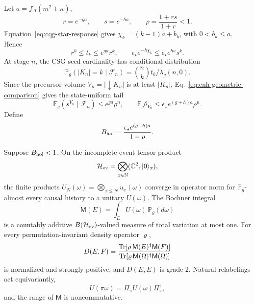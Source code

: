 Let \(a=f_\Delta(m^2+\kappa)\),
\[
 r=e^{-ga},\qquad s=e^{-ha},\qquad
 \rho=\frac{1+rs}{1+r}<1.
\]
Equation~\eqref{eq:cqg-star-response} gives
\(\chi_k=(k-1)a+b_k\), with \(0<b_k\le a\).  Hence
\begin{equation}
 r^k\le t_k\le e^{ga}r^k,\qquad
 \epsilon_\star e^{-h\chi_k}
 \le \epsilon_\star e^{ha}s^k.
 \label{eq:cnh-geometric-comparison}
\end{equation}
At stage \(n\), the CSG seed cardinality has conditional distribution
\[
 \mathbb P_g(|K_n|=k\mid\mathcal F_n)
 =\binom nk t_k/\lambda_g(n,0).
\]
Since the precursor volume \(V_n=|\downarrow K_n|\) is at least
\(|K_n|\), Eq.~\eqref{eq:cnh-geometric-comparison} gives the
state-uniform tail
\begin{equation}
 \mathbb E_g(s^{V_n}\mid\mathcal F_n)
 \le e^{ga}\rho^n,\qquad
 \mathbb E_g\theta_{V_n}
 \le\epsilon_\star e^{(g+h)a}\rho^n.
 \label{eq:cnh-tail}
\end{equation}
Define
\[
 B_{\rm hol}=
 \frac{\epsilon_\star e^{(g+h)a}}{1-\rho}.
\]

\begin{theorem}
\label{thm:covariant-nonabelian-holonomy}
Suppose \(B_{\rm hol}<1\).  On the incomplete event tensor product
\[
 \mathcal H_{\rm ev}
 =\bigotimes_{x\in\mathbb N}(\mathbb C^2,|0\rangle_x),
\]
the finite products \(U_N(\omega)=\bigotimes_{x\le N}u_x(\omega)\)
converge in operator norm for \(\mathbb P_g\)-almost every causal history to
a unitary \(U(\omega)\).  The Bochner integral
\begin{equation}
 \mathsf M(E)=\int_EU(\omega)\,\mathbb P_g(d\omega)
 \label{eq:cnh-operator-measure}
\end{equation}
is a countably additive \(B(\mathcal H_{\rm ev})\)-valued measure of total
variation at most one.  For every permutation-invariant density operator
\(\varrho\),
\begin{equation}
 D(E,F)=
 \frac{\operatorname{Tr}[\varrho\,\mathsf M(E)^\dagger\mathsf M(F)]}
 {\operatorname{Tr}[\varrho\,\mathsf M(\Omega)^\dagger\mathsf M(\Omega)]}
 \label{eq:cnh-decoherence}
\end{equation}
is normalized and strongly positive, and \(D(E,E)\) is grade 2.  Natural
relabelings act equivariantly,
\[
 U(\pi\omega)=\Pi_\pi U(\omega)\Pi_\pi^\dagger,
\]
and the range of \(\mathsf M\) is noncommutative.
\end{theorem}

